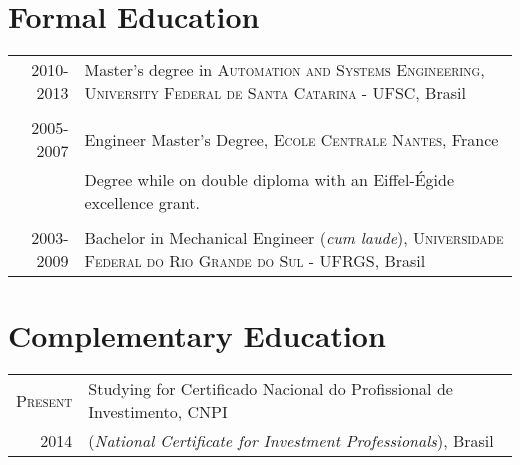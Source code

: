 \documentclass[a4paper,10pt]{article} %
\begin{document}

\section{Formal Education}
\begin{tabular}{rp{11cm}}	
  \textsc{2010-2013} &
  Master's degree in \textsc{Automation and Systems
  Engineering}, \textsc{University Federal de Santa Catarina} - UFSC,
Brasil\\

&\\


\textsc{2005-2007} &
Engineer Master's Degree, \textsc{Ecole Centrale Nantes}, France\\

& Degree while on double diploma with an Eiffel-Égide excellence grant.\\
&\\


\textsc{2003-2009} &
Bachelor in Mechanical Engineer (\textit{cum laude}),
\textsc{Universidade Federal do Rio Grande do Sul} - UFRGS, Brasil \\
 
\end{tabular}


\section{Complementary Education}
\begin{tabular}{rp{11cm}}	
  \textsc{Present} &
  Studying for Certificado Nacional do Profissional
de Investimento, CNPI \\

2014 &
(\textit{National Certificate for Investment Professionals}),
Brasil\\
 
\end{tabular}
\end{document}
